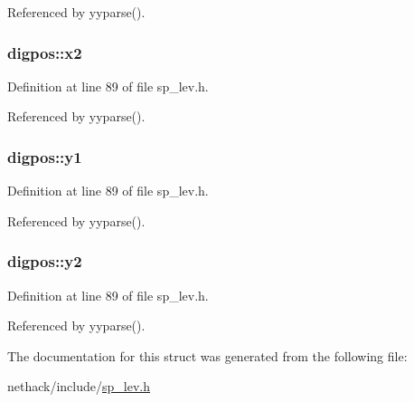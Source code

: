 Referenced by yyparse().

\hypertarget{structdigpos_a092425268fb484d27cdc0a3347e8219d}{
\subsubsection[{x2}]{ digpos\+::x2}}\label{structdigpos_a092425268fb484d27cdc0a3347e8219d}


Definition at line 89 of file sp\+\_\+lev.\+h.



Referenced by yyparse().

\hypertarget{structdigpos_acbd032a285fefd8559374c9dc0d2e5da}{
\subsubsection[{y1}]{ digpos\+::y1}}\label{structdigpos_acbd032a285fefd8559374c9dc0d2e5da}


Definition at line 89 of file sp\+\_\+lev.\+h.



Referenced by yyparse().

\hypertarget{structdigpos_a190b007024704e0ff3f122944c74f4d4}{
\subsubsection[{y2}]{ digpos\+::y2}}\label{structdigpos_a190b007024704e0ff3f122944c74f4d4}


Definition at line 89 of file sp\+\_\+lev.\+h.



Referenced by yyparse().



The documentation for this struct was generated from the following file\+:\begin{DoxyCompactItemize}
\item 
nethack/include/\hyperlink{sp__lev_8h}{sp\+\_\+lev.\+h}\end{DoxyCompactItemize}
